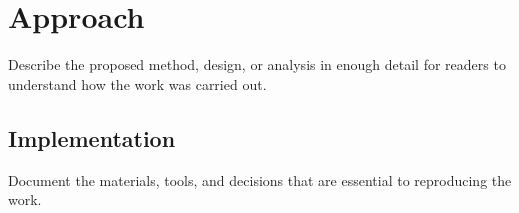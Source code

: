 \section{Approach}
Describe the proposed method, design, or analysis in enough detail for readers
to understand how the work was carried out.
\subsection{Implementation}
Document the materials, tools, and decisions that are essential to reproducing
the work.
